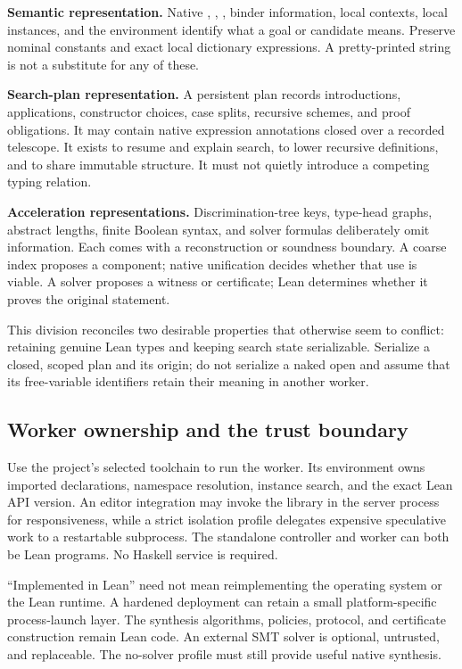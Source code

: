 \textbf{Semantic representation.} Native , , , binder information, local contexts, local instances, and the environment identify what a goal or candidate means. Preserve nominal constants and exact local dictionary expressions. A pretty-printed string is not a substitute for any of these.

\textbf{Search-plan representation.} A persistent plan records introductions, applications, constructor choices, case splits, recursive schemes, and proof obligations. It may contain native expression annotations closed over a recorded telescope. It exists to resume and explain search, to lower recursive definitions, and to share immutable structure. It must not quietly introduce a competing typing relation.

\textbf{Acceleration representations.} Discrimination-tree keys, type-head graphs, abstract lengths, finite Boolean syntax, and solver formulas deliberately omit information. Each comes with a reconstruction or soundness boundary. A coarse index proposes a component; native unification decides whether that use is viable. A solver proposes a witness or certificate; Lean determines whether it proves the original statement.

This division reconciles two desirable properties that otherwise seem to conflict: retaining genuine Lean types and keeping search state serializable. Serialize a closed, scoped plan and its origin; do not serialize a naked open  and assume that its free-variable identifiers retain their meaning in another worker.

\subsection{Worker ownership and the trust boundary}

Use the project's selected toolchain to run the worker. Its environment owns imported declarations, namespace resolution, instance search, and the exact Lean API version. An editor integration may invoke the library in the server process for responsiveness, while a strict isolation profile delegates expensive speculative work to a restartable subprocess. The standalone controller and worker can both be Lean programs. No Haskell service is required.

``Implemented in Lean'' need not mean reimplementing the operating system or the Lean runtime. A hardened deployment can retain a small platform-specific process-launch layer. The synthesis algorithms, policies, protocol, and certificate construction remain Lean code. An external SMT solver is optional, untrusted, and replaceable. The no-solver profile must still provide useful native synthesis.

